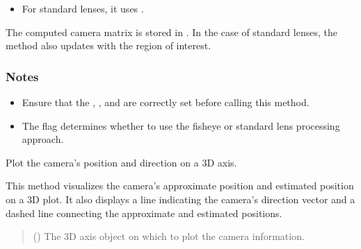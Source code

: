 \documentclass[letterpaper,10pt,english]{sphinxmanual}
\begin{document}
\begin{fulllineitems}
\begin{fulllineitems}
\begin{itemize}
\item {} 
\sphinxAtStartPar
For standard lenses, it uses .

\end{itemize}

\sphinxAtStartPar
The computed camera matrix is stored in . In the case of
standard lenses, the method also updates  with the region of
interest.
\subsubsection*{Notes}
\begin{itemize}
\item {} 
\sphinxAtStartPar
Ensure that the , , and  are
correctly set before calling this method.

\item {} 
\sphinxAtStartPar
The  flag determines whether to use the fisheye or
standard lens processing approach.

\end{itemize}

\end{fulllineitems}


\begin{fulllineitems}
\label{\detokenize{CameraUtils:id16}}
\pysigstartsignatures
{}
\pysigstopsignatures
\sphinxAtStartPar
Plot the camera’s position and direction on a 3D axis.

\sphinxAtStartPar
This method visualizes the camera’s approximate position and estimated position
on a 3D plot. It also displays a line indicating the camera’s direction vector and
a dashed line connecting the approximate and estimated positions.
\begin{quote}\begin{description}
\sphinxAtStartPar
{} () \textendash{} The 3D axis object on which to plot the camera information.

\end{description}\end{quote}

\end{fulllineitems}
\end{fulllineitems}
\end{document}
